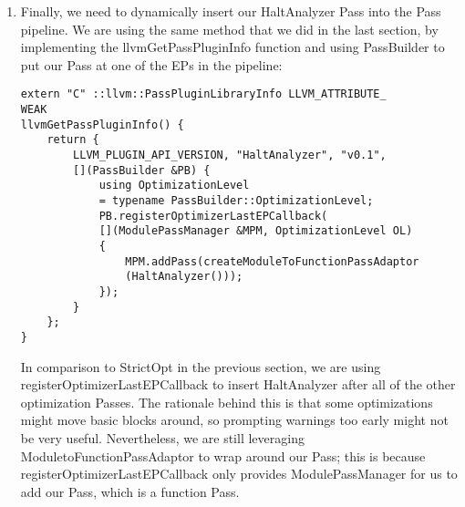 \begin{enumerate}
\begin{lstlisting}[style=styleCXX]
PreservedAnalyses
HaltAnalyzer::run(Function &F, FunctionAnalysisManager
&FAM) {
	…
	SmallVector<BasicBlock*, 4> DomBBs;
	for (auto *I : Calls) {
		auto *BB = I->getParent();
		DomBBs.clear();
		DT.getDescendants(BB, DomBBs);
		for (auto *DomBB : DomBBs) {
			// excluding the block containing `my_halt` call site
			if (DomBB != BB) {
				DomBB->printAsOperand(
				errs() << "[WARNING] Unreachable BB: ");
				errs() << "\n";
			}
		}
	}
	return PreservedAnalyses::all();
}
\end{lstlisting}

By using the DominatorTree::getDescendants method, we can retrieve all of the basic blocks dominated by a my\_halt call site. Note that the results from getDescendants will also contain the block you put into the query (in this case, the block containing the my\_halt call sites), so we need to exclude it before printing the basic block name using the BasicBlock::printAsOperand method.

With the ending of the returning PreservedAnalyses::all(), which tells AnalysisManager that this Pass does not invalidate any analysis since we don't modify the IR at all, we will wrap up the HaltAnalyzer::run method here.

\item Finally, we need to dynamically insert our HaltAnalyzer Pass into the Pass pipeline. We are using the same method that we did in the last section, by implementing the llvmGetPassPluginInfo function and using PassBuilder to put our Pass at one of the EPs in the pipeline:

\begin{lstlisting}[style=styleCXX]
extern "C" ::llvm::PassPluginLibraryInfo LLVM_ATTRIBUTE_
WEAK
llvmGetPassPluginInfo() {
	return {
		LLVM_PLUGIN_API_VERSION, "HaltAnalyzer", "v0.1",
		[](PassBuilder &PB) {
			using OptimizationLevel
			= typename PassBuilder::OptimizationLevel;
			PB.registerOptimizerLastEPCallback(
			[](ModulePassManager &MPM, OptimizationLevel OL)
			{
				MPM.addPass(createModuleToFunctionPassAdaptor
				(HaltAnalyzer()));
			});
		}
	};
}
\end{lstlisting}

In comparison to StrictOpt in the previous section, we are using registerOptimizerLastEPCallback to insert HaltAnalyzer after all of the other optimization Passes. The rationale behind this is that some optimizations might move basic blocks around, so prompting warnings too early might not be very useful. Nevertheless, we are still leveraging ModuletoFunctionPassAdaptor to wrap around our Pass; this is because registerOptimizerLastEPCallback only provides ModulePassManager for us to add our Pass, which is a function Pass.

\end{enumerate}


